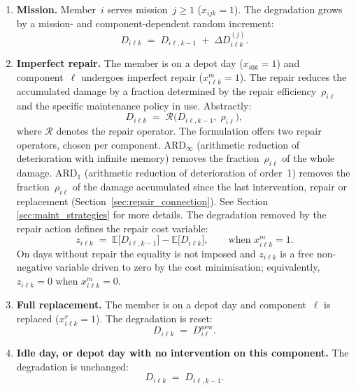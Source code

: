 \documentclass[11pt,a4paper]{article}
\theoremstyle{plain}
\theoremstyle{definition}
\theoremstyle{remark}
\begin{document}
\begin{enumerate}[label=(\roman*)]
  \item \textbf{Mission.} Member~$i$ serves mission~$j \ge 1$ ($x_{ijk}=1$).
    The degradation grows by a mission- and component-dependent random increment:
    \begin{equation}\label{eq:dyn_mission}
      D_{i\ell k} \;=\; D_{i\ell,k-1} \;+\; \Delta D_{i\ell k}^{(j)}.
    \end{equation}

  \item \textbf{Imperfect repair.} The member is on a depot day ($x_{i0k}=1$) and component~$\ell$ undergoes imperfect repair ($x^m_{i\ell k}=1$).
    The repair reduces the accumulated damage by a fraction determined by the repair efficiency~$\rho_{i\ell}$ and the specific maintenance policy in use.
    Abstractly:
    \begin{equation}\label{eq:dyn_repair}
      D_{i\ell k} \;=\; \mathcal{R}\!\bigl(D_{i\ell,k-1},\;\rho_{i\ell}\bigr),
    \end{equation}
    where $\mathcal{R}$ denotes the repair operator.
    The formulation offers two repair operators, chosen per component.
    $\text{ARD}_\infty$ (arithmetic reduction of deterioration with infinite memory) removes the fraction~$\rho_{i\ell}$ of the whole damage.
    $\text{ARD}_1$ (arithmetic reduction of deterioration of order~1) removes the fraction~$\rho_{i\ell}$ of the damage accumulated since the last intervention, repair or replacement (Section~\ref{sec:repair_connection}).
    See Section \ref{sec:maint_strategies} for more details.
    The degradation removed by the repair action defines the repair cost variable:
    \begin{equation}\label{eq:z_def}
      z_{i\ell k} \;=\; \mathbb{E}\bigl[D_{i\ell,k-1}\bigr] - \mathbb{E}\bigl[D_{i\ell k}\bigr],
      \qquad \text{when } x^m_{i\ell k}=1.
    \end{equation}
    On days without repair the equality is not imposed and $z_{i\ell k}$ is a free non-negative variable driven to zero by the cost minimisation; equivalently, $z_{i\ell k} = 0$ when $x^m_{i\ell k} = 0$.

  \item \textbf{Full replacement.} The member is on a depot day and component~$\ell$ is replaced ($x^r_{i\ell k}=1$).
    The degradation is reset:
    \begin{equation}\label{eq:dyn_replace}
      D_{i\ell k} \;=\; D^{\mathrm{new}}_{i\ell}.
    \end{equation}

  \item \textbf{Idle day, or depot day with no intervention on this component.}
    The degradation is unchanged:
    \begin{equation}\label{eq:dyn_idle}
      D_{i\ell k} \;=\; D_{i\ell,k-1}.
    \end{equation}
\end{enumerate}
\end{document}
